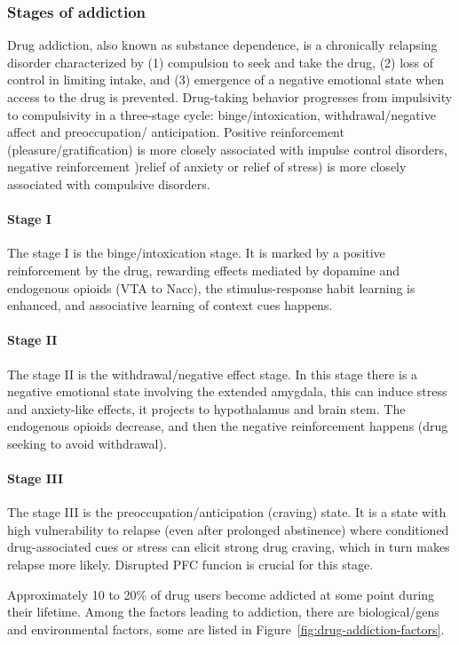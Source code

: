 \documentclass[12pt,article,oneside,a4paper]{memoir}
\begin{document}
\subsubsection{Stages of addiction}
Drug addiction, also known as substance dependence, is a chronically relapsing
disorder characterized by (1) compulsion to seek and take the drug, (2) loss of
control in limiting intake, and (3) emergence of a negative emotional state when
access to the drug is prevented.
Drug-taking behavior progresses from impulsivity to compulsivity in a three-stage
cycle: binge/intoxication, withdrawal/negative affect and preoccupation/
anticipation. Positive reinforcement (pleasure/gratification) is more closely
associated with impulse control disorders, negative reinforcement )relief of
anxiety or relief of stress) is more closely associated with compulsive disorders.

\paragraph{Stage I}
The stage I is the binge/intoxication stage. It is marked by a positive
reinforcement by the drug, rewarding effects mediated by dopamine and endogenous
opioids (VTA to Nacc), the stimulus-response habit learning is enhanced, and
associative learning of context cues happens.

\paragraph{Stage II}
The stage II is the withdrawal/negative effect stage. In this stage there is
a negative emotional state involving the extended amygdala, this can induce
stress and anxiety-like effects, it projects to hypothalamus and brain stem.
The endogenous opioids decrease, and then the negative reinforcement happens
(drug seeking to avoid withdrawal).

\paragraph{Stage III}
The stage III is the preoccupation/anticipation (craving) state. It is a state
with high vulnerability to relapse (even after prolonged abstinence) where
conditioned drug-associated cues or stress can elicit strong drug craving, which
in turn makes relapse more likely. Disrupted PFC funcion is crucial for this stage.

Approximately 10 to 20\%  of drug users become addicted at some point during their
lifetime. Among the factors leading to addiction, there are biological/gens and
environmental factors, some are listed in Figure~\ref{fig:drug-addiction-factors}.
\end{document}

